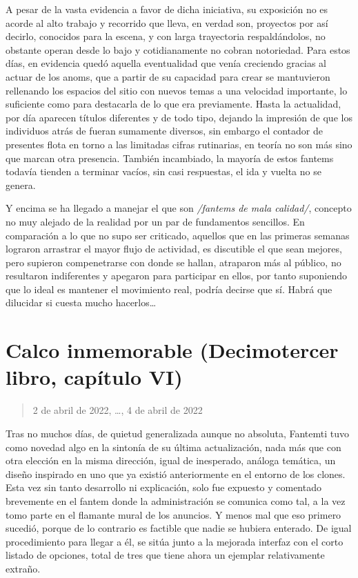 \documentclass[
]{book}
\begin{document}
A pesar de la vasta evidencia a favor de dicha iniciativa, su exposición no es acorde al alto trabajo y recorrido que lleva, en verdad son, proyectos por así decirlo, conocidos para la escena, y con larga trayectoria respaldándolos, no obstante operan desde lo bajo y cotidianamente no cobran notoriedad. Para estos días, en evidencia quedó aquella eventualidad que venía creciendo gracias al actuar de los anoms, que a partir de su capacidad para crear se mantuvieron rellenando los espacios del sitio con nuevos temas a una velocidad importante, lo suficiente como para destacarla de lo que era previamente. Hasta la actualidad, por día aparecen títulos diferentes y de todo tipo, dejando la impresión de que los individuos atrás de fueran sumamente diversos, sin embargo el contador de presentes flota en torno a las limitadas cifras rutinarias, en teoría no son más sino que marcan otra presencia. También incambiado, la mayoría de estos fantems todavía tienden a terminar vacíos, sin casi respuestas, el ida y vuelta no se genera.

Y encima se ha llegado a manejar el que son \emph{/fantems de mala calidad/}, concepto no muy alejado de la realidad por un par de fundamentos sencillos. En comparación a lo que no supo ser criticado, aquellos que en las primeras semanas lograron arrastrar el mayor flujo de actividad, es discutible el que sean mejores, pero supieron compenetrarse con donde se hallan, atraparon más al público, no resultaron indiferentes y apegaron para participar en ellos, por tanto suponiendo que lo ideal es mantener el movimiento real, podría decirse que sí. Habrá que dilucidar si cuesta mucho hacerlos\ldots{}

\hypertarget{calco-inmemorable-decimotercer-libro-capuxedtulo-vi}{%
\section{Calco inmemorable (Decimotercer libro, capítulo VI)}\label{calco-inmemorable-decimotercer-libro-capuxedtulo-vi}}

\begin{quote}
2 de abril de 2022, \ldots, 4 de abril de 2022
\end{quote}

Tras no muchos días, de quietud generalizada aunque no absoluta, Fantemti tuvo como novedad algo en la sintonía de su última actualización, nada más que con otra elección en la misma dirección, igual de inesperado, análoga temática, un diseño inspirado en uno que ya existió anteriormente en el entorno de los clones. Esta vez sin tanto desarrollo ni explicación, solo fue expuesto y comentado brevemente en el fantem donde la administración se comunica como tal, a la vez tomo parte en el flamante mural de los anuncios. Y menos mal que eso primero sucedió, porque de lo contrario es factible que nadie se hubiera enterado. De igual procedimiento para llegar a él, se sitúa junto a la mejorada interfaz con el corto listado de opciones, total de tres que tiene ahora un ejemplar relativamente extraño.
\end{document}
